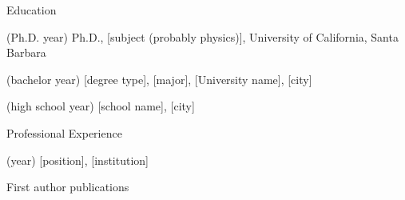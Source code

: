 \begin{vitae}
\begin{vitaesection}{Education}
\item [(Ph.D. year)] Ph.D., [subject (probably physics)], University of California, Santa Barbara
\item [(bachelor year)] [degree type], [major], [University name], [city]
\item [(high school year)] [school name], [city]
\end{vitaesection}

\begin{vitaesection}{Professional Experience}
\item [(year)] [position], [institution]
\end{vitaesection}

\begin{vitaesectnodate}{First author publications}

\end{vitaesectnodate}
\end{vitae}
